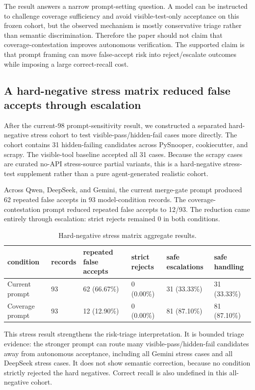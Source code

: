 \documentclass[conference]{IEEEtran}
\begin{document}
The result answers a narrow prompt-setting question. A model can be instructed to challenge coverage sufficiency and avoid visible-test-only acceptance on this frozen cohort, but the observed mechanism is mostly conservative triage rather than semantic discrimination. Therefore the paper should not claim that coverage-contestation improves autonomous verification. The supported claim is that prompt framing can move false-accept risk into reject/escalate outcomes while imposing a large correct-recall cost.

\subsection{A hard-negative stress matrix reduced false accepts through escalation}

After the current-98 prompt-sensitivity result, we constructed a separated hard-negative stress cohort to test visible-pass/hidden-fail cases more directly. The cohort contains 31 hidden-failing candidates across PySnooper, cookiecutter, and scrapy. The visible-tool baseline accepted all 31 cases. Because the scrapy cases are curated no-API stress-source partial variants, this is a hard-negative stress-test supplement rather than a pure agent-generated realistic cohort.

Across Qwen, DeepSeek, and Gemini, the current merge-gate prompt produced 62 repeated false accepts in 93 model-condition records. The coverage-contestation prompt reduced repeated false accepts to 12/93. The reduction came entirely through escalation: strict rejects remained 0 in both conditions.

\begin{table}[t]
\centering
\scriptsize
\setlength{\tabcolsep}{2pt}
\caption{Hard-negative stress matrix aggregate results.}
\label{tab:apsec-5}
\begin{tabularx}{\textwidth}{YYYYYY}
\toprule
condition & records & repeated false accepts & strict rejects & safe escalations & safe handling \\
\midrule
Current prompt & 93 & 62 (66.67\%) & 0 (0.00\%) & 31 (33.33\%) & 31 (33.33\%) \\
Coverage prompt & 93 & 12 (12.90\%) & 0 (0.00\%) & 81 (87.10\%) & 81 (87.10\%) \\
\bottomrule
\end{tabularx}
\end{table}

This stress result strengthens the risk-triage interpretation. It is bounded triage evidence: the stronger prompt can route many visible-pass/hidden-fail candidates away from autonomous acceptance, including all Gemini stress cases and all DeepSeek stress cases. It does not show semantic correction, because no condition strictly rejected the hard negatives. Correct recall is also undefined in this all-negative cohort.
\end{document}
